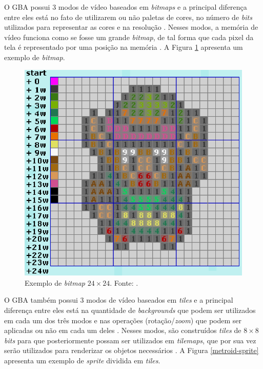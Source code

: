     O GBA possui 3 modos de vídeo baseados em \textit{bitmaps} e a principal diferença entre eles está no fato de utilizarem ou não paletas de cores, no número de \textit{bits} utilizados para representar as cores e na resolução \cite{harbour}. Nesses modos, a memória de vídeo funciona como se fosse um grande \textit{bitmap}, de tal forma que cada pixel da tela é representado por uma posição na memória \cite{tonc}. A Figura \ref{link-bitmap} apresenta um exemplo de \textit{bitmap}.

    \begin{figure}[H]
    \centering \includegraphics[keepaspectratio=true,scale=0.6]{figuras/link-bitmap.eps}
      \caption[Exemplo de \textit{bitmap} $24\times24$]
        {Exemplo de \textit{bitmap} $24\times24$. Fonte: \cite{tonc}.}
      \label{link-bitmap}
    \end{figure}

    O GBA também possui 3 modos de vídeo baseados em \textit{tiles} e a principal diferença entre eles está na quantidade de \textit{backgrounds} que podem ser utilizados em cada um dos três modos e nas operações (rotação/\textit{zoom}) que podem ser aplicadas ou não em cada um deles \cite{harbour}. Nesses modos, são construídos \textit{tiles} de $8\times8$ \textit{bits} para que posteriormente possam ser utilizados em \textit{tilemaps}, que por sua vez serão utilizados para renderizar os objetos necessários \cite{tonc}. A Figura \ref{metroid-sprite} apresenta um exemplo de \textit{sprite} dividida em \textit{tiles}.

